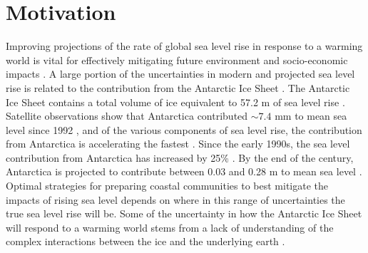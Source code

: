 
\section{Motivation}

Improving projections of the rate of global sea level rise in response to a warming world is vital for effectively mitigating future environment and socio-economic impacts \citep{durandsealevel2022}. A large portion of the uncertainties in modern and projected sea level rise is related to the contribution from the Antarctic Ice Sheet \citep[Figure \ref{fig:chp1_SLR}b, ][]{bamberice2022, edwardsprojected2021, slaterantarctic2018, otosakamass2023}. The Antarctic Ice Sheet contains a total volume of ice equivalent to 57.2 m of sea level rise \citep{fretwellbedmap22013}. Satellite observations show that Antarctica contributed $\sim7.4$ mm to mean sea level since 1992 \citep{otosakamass2023}, and of the various components of sea level rise, the contribution from Antarctica is accelerating the fastest \citep[Figure \ref{fig:chp1_SLR}a, ][]{neremclimatechangedriven2018}. Since the early 1990s, the sea level contribution from Antarctica has increased by 25\% \citep{otosakamass2023}. By the end of the century, Antarctica is projected to contribute between 0.03 and 0.28 m to mean sea level \citep[RCP 8.5,][]{intergovernmentalpanelonclimatechangeipccocean2022}. Optimal strategies for preparing coastal communities to best mitigate the impacts of rising sea level depends on where in this range of uncertainties the true sea level rise will be. Some of the uncertainty in how the Antarctic Ice Sheet will respond to a warming world stems from a lack of understanding of the complex interactions between the ice and the underlying earth \citep[e.g.][]{schlegelexploration2018, zhaobasal2018}.


